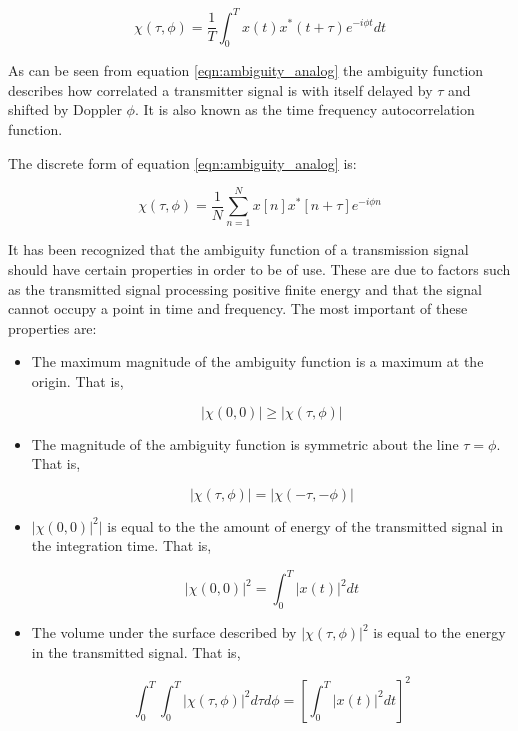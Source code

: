 \documentclass[a4paper]{report}
\numberwithin{equation}{chapter}
\begin{document}
\begin{equation}
\chi(\tau, \phi) = \frac{1}{T} \int_0^T x(t)x^*(t + \tau)e^{-i\phi t}dt
\label{eqn:ambiguity_analog}
\end{equation}

As can be seen from equation \ref{eqn:ambiguity_analog} the ambiguity function describes how correlated a transmitter signal is with itself delayed by $\tau$ and shifted by Doppler $\phi$. It is also known as the time frequency autocorrelation function.

The discrete form of equation \ref{eqn:ambiguity_analog} is:

\begin{equation}
\chi(\tau, \phi) = \frac{1}{N} \sum_{n=1}^N x[n]x^*[n + \tau]e^{-i\phi n}
\label{eqn:ambiguity_discrete}
\end{equation}

It has been recognized that the ambiguity function of a transmission signal should have certain properties in order to be of use. These are due to factors such as the transmitted signal processing positive finite energy and that the signal cannot occupy a point in time and frequency. The most important of these properties are:

\begin{itemize}
\item{The maximum magnitude of the ambiguity function is a maximum at the origin. That is,

\begin{equation}
|\chi(0, 0)| \geq |\chi(\tau, \phi)|
\end{equation}}
\item{The magnitude of the ambiguity function is symmetric about the line $\tau = \phi$. That is,

\begin{equation}
|\chi(\tau, \phi)| = |\chi(-\tau, -\phi)|
\end{equation}}

\item{$|\chi(0, 0)|^2|$ is equal to the the amount of energy of the transmitted signal in the integration time. That is,

\begin{equation}
|\chi(0, 0)|^2 = \int_0^T |x(t)|^2 dt
\end{equation}}

\item{The volume under the surface described by $|\chi(\tau, \phi)|^2$ is equal to the energy in the transmitted signal. That is,

\begin{equation}
\int_0^T \int_0^T|\chi(\tau, \phi)|^2 d\tau d\phi = \left[\int_0^T |x(t)|^2 dt \right]^2
\end{equation}}
\end{itemize}
\end{document}
